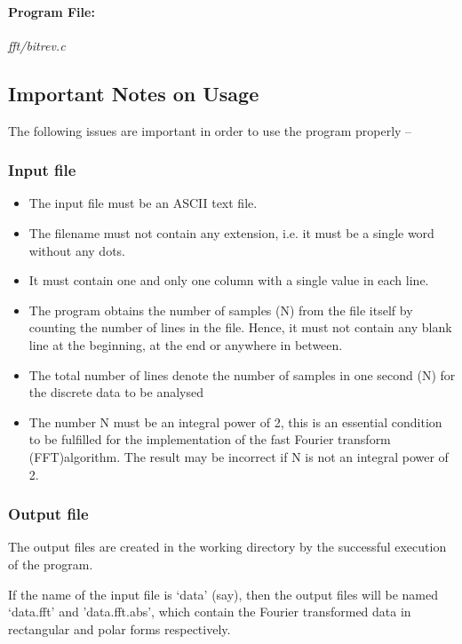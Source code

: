 \documentclass[a4paper,11pt]{report}
\begin{document}
\paragraph{Program File:} \textit{fft/bitrev.c}
\vspace{5pt}
{\scriptsize
\begin{lgrind}

\end{lgrind}
}
\clearpage

\subsection{Important Notes on Usage} 

The following issues are important in order to use the program properly --

\subsubsection{Input file}
\begin{itemize}
\item The input file must be an ASCII text file.
\item The filename must not contain any extension, i.e. it must be a single word without any dots.
\item It must contain one and only one column with a single value in each line.
\item The program obtains the number of samples (N) from the file itself by counting the number of lines in the file. Hence, it must not contain any blank line at the beginning, at the end or anywhere in between.
\item The total number of lines denote the number of samples in one second (N) for the discrete data to be analysed
\item The number N must be an integral power of 2, this is an essential condition to be fulfilled for the implementation of the fast Fourier transform (FFT)algorithm. The result may be incorrect if N is not an integral power of 2.  
\end{itemize}

\subsubsection{Output file}

The output files are created in the working directory by the successful execution of the program. 

If the name of the input file is `data' (say), then the output files will be named `data.fft' and 'data.fft.abs', which contain the Fourier transformed data in rectangular and polar forms respectively.
\end{document}
